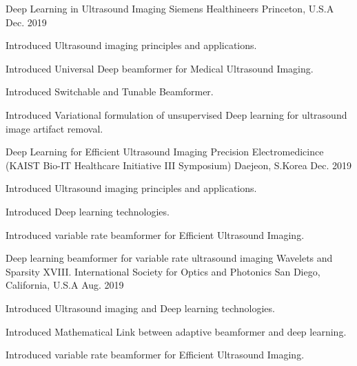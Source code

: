 

\begin{cventries}

  \cventry
    {Deep Learning in Ultrasound Imaging} %
    {Siemens Healthineers} %
    {Princeton, U.S.A} %
    {Dec. 2019} %
    {
      \begin{cvitems} %
        \item {Introduced Ultrasound imaging principles and applications.}
        \item {Introduced Universal Deep beamformer for Medical Ultrasound Imaging.}
        \item {Introduced Switchable and Tunable Beamformer.}
        \item {Introduced Variational formulation of unsupervised Deep learning for ultrasound image artifact removal.}
      \end{cvitems}
    }
    
  \cventry
    {Deep Learning for Efficient Ultrasound Imaging} %
    {Precision Electromedicince (KAIST Bio-IT Healthcare Initiative III Symposium)} %
    {Daejeon, S.Korea} %
    {Dec. 2019} %
    {
      \begin{cvitems} %
        \item {Introduced Ultrasound imaging principles and applications.}
        \item {Introduced Deep learning technologies.}
        \item {Introduced variable rate beamformer for Efficient Ultrasound Imaging.}
      \end{cvitems}
    }

  \cventry
    {Deep learning beamformer for variable rate ultrasound imaging} %
    {Wavelets and Sparsity XVIII. International Society for Optics and Photonics} %
    {San Diego, California, U.S.A} %
    {Aug. 2019} %
    {
      \begin{cvitems} %
        \item {Introduced Ultrasound imaging and Deep learning technologies.}
        \item {Introduced Mathematical Link between adaptive beamformer and deep learning.}
        \item {Introduced variable rate beamformer for Efficient Ultrasound Imaging.}
      \end{cvitems}
    }

\end{cventries}
